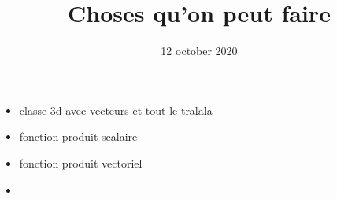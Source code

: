 \documentclass[a4paper,1pt]{article}
\title{Choses qu'on peut faire}
\date{12 october 2020}
\begin{document}
\maketitle

\begin{itemize}
    \item classe 3d avec vecteurs et tout le tralala
    \item fonction produit scalaire
    \item fonction produit vectoriel
    \item 
\end{itemize}
\end{document}
